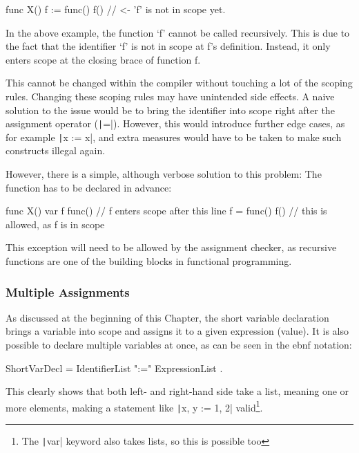 \begin{code}
\begin{gocode}
func X() {
	f := func() {
		f() // <- 'f' is not in scope yet.
	}
}
\end{gocode}
\end{code}
In the above example, the function `f' cannot be called recursively. This is due
to the fact that the identifier `f' is not in scope at f's definition. Instead,
it only enters scope at the closing brace of function f.

This cannot be changed within the compiler without touching a lot of the scoping
rules. Changing these scoping rules may have unintended side effects. A naive
solution to the issue would be to bring the identifier into scope right after the
assignment operator (\texttt|=|). However, this would introduce further
edge cases, as for example \texttt|x := x|, and extra measures would have
to be taken to make such constructs illegal again.

However, there is a simple, although verbose solution to this problem: The function
has to be declared in advance:

\begin{code}
	\begin{gocode}
func X() {
	var f func() // f enters scope after this line
	f = func() {
		f() // this is allowed, as f is in scope
	}
}
\end{gocode}
\end{code}
This exception will need to be allowed by the assignment checker, as recursive functions
are one of the building blocks in functional programming.

\subsubsection{Multiple Assignments}\label{sec:multi-assign}


As discussed at the beginning of this Chapter, the short variable declaration brings
a variable into scope and assigns it to a given expression (value). It is also
possible to declare multiple variables at once, as can be seen in the \gls{ebnf}
notation:
\begin{code}
	\begin{bnfcode}
ShortVarDecl = IdentifierList ":=" ExpressionList .
	\end{bnfcode}
\end{code}
This clearly shows that both left- and right-hand side take a list, meaning one or more
elements, making a statement like \texttt|x, y := 1, 2| valid\footnote{The
\texttt|var| keyword also takes lists, so this is possible too}.

